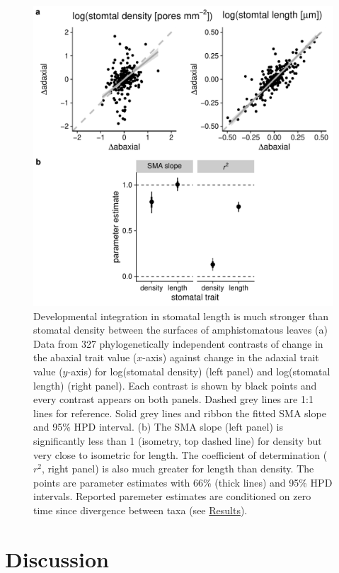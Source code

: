 \documentclass[
  10pt,
]{article}
\begin{document}
\begin{figure}[ht]
\includegraphics[width=\textwidth]{../figures/h2.pdf}
\caption{Developmental integration in stomatal length is much stronger than stomatal density between the surfaces of amphistomatous leaves (a) Data from 327 phylogenetically independent contrasts of change in the abaxial trait value ($x$-axis) against change in the adaxial trait value ($y$-axis) for log(stomatal density) (left panel) and log(stomatal length) (right panel). Each contrast is shown by black points and every contrast appears on both panels. Dashed grey lines are 1:1 lines for reference. Solid grey lines and ribbon the fitted SMA slope and 95\% HPD interval. (b) The SMA slope (left panel) is significantly less than 1 (isometry, top dashed line) for density but very close to isometric for length. The coefficient of determination ($r^2$, right panel) is also much greater for length than density. The points are parameter estimates with 66\% (thick lines) and 95\% HPD intervals. Reported paremeter estimates are conditioned on zero time since divergence between taxa (see \protect\hyperlink{results}{Results}).}
\label{fig:h2}
\end{figure}

\hypertarget{discussion}{%
\section{Discussion}\label{discussion}}
\end{document}
